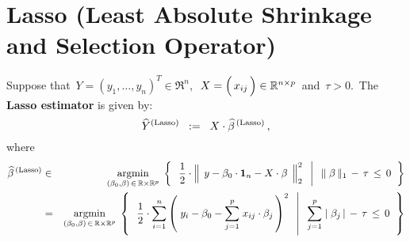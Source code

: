 
\section{Lasso (Least Absolute Shrinkage and Selection Operator)}
\setcounter{theorem}{0}

\renewcommand{\theenumi}{\roman{enumi}}
\renewcommand{\labelenumi}{\textnormal{(\theenumi)}$\;\;$}


Suppose that
\,$Y = (y_{1},\ldots,y_{n})^{T} \in \Re^{n}$,\,
\,$X = \left(\,\overset{{\color{white}-}}{x_{ij}}\,\right)\in\Re^{n \times p}$\, and
\,$\tau > 0$.\,
The \textbf{Lasso estimator} is given by:
\begin{equation*}
\widehat{Y}^{\textnormal{(Lasso)}}
\;\; := \;\;
	X \cdot \widehat{\beta}^{\,\textnormal{(Lasso)}}\,,
\end{equation*}
where
\begin{eqnarray*}
\widehat{\beta}^{\,\textnormal{(Lasso)}}
& \in &
	\underset{(\beta_{0},\beta)\,\in\,\Re\times\Re^{p}}{\argmin}\;
	\left\{\;\;
		\left.
		\dfrac{1}{2}
		\cdot
		\left\Vert\;\, y \overset{{\color{white}.}}{-} \beta_{0}\cdot\mathbf{1}_{n} - X\cdot\beta \,\;\right\Vert_{2}^{2}
		\;\;\,\right\vert\;\;
		\Vert\;\beta\,\Vert_{1} \, - \, \tau \, \leq \, 0
		\;\;\right\}
\\
& = &
	\underset{(\beta_{0},\beta)\,\in\,\Re\times\Re^{p}}{\argmin}\;
	\left\{\;\;
		\left.
		\dfrac{1}{2}
		\cdot
		\overset{n}{\underset{i=1}{\sum}}
		\left(\; y_{i} - \beta_{0} - \overset{p}{\underset{j=1}{\sum}}\; x_{ij}\cdot\beta_{j}\,\right)^{2}
		\;\;\,\right\vert\;\;
		\overset{p}{\underset{j=1}{\sum}}\;
		\vert\;\beta_{j}\,\vert
		\, - \,
		\tau \, \leq \, 0
		\;\;\right\}
\end{eqnarray*}



